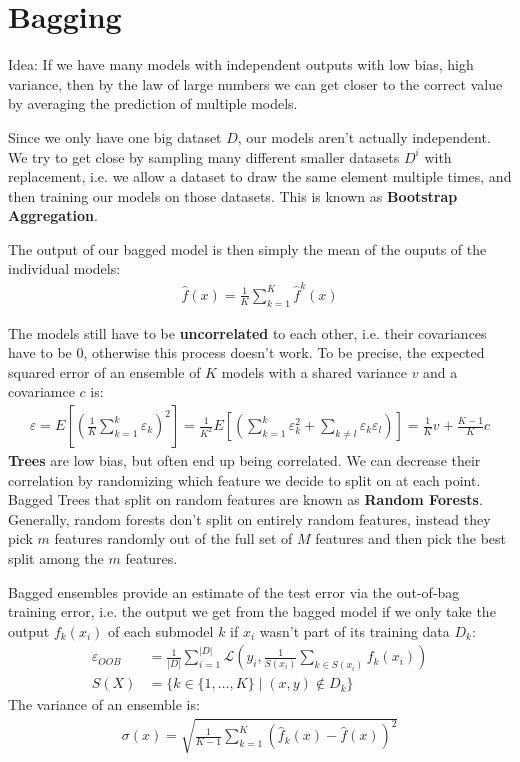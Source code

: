 \documentclass{report}
\renewcommand\epsilon{\varepsilon}
\newcommand{\tbf}{\textbf}
\newcommand*{\newpar}{\par\vspace{\baselineskip}\noindent}
\newcommand{\loss}{\mathcal{L}}
\begin{document}
\section{Bagging}
Idea: If we have many models with independent outputs with low bias, high variance, then by the law of large numbers we can get closer to the correct value by averaging the prediction of multiple models.
\newpar
Since we only have one big dataset $D$, our models aren't actually independent. We try to get close by sampling many different smaller datasets $D^i$ with replacement, i.e. we allow a dataset to draw the same element multiple times, and then training our models on those datasets. This is known as \tbf{Bootstrap Aggregation}.
\newpar
The output of our bagged model is then simply the mean of the ouputs of the individual models:
\begin{align}
 \hat{f}(x) = \frac{1}{K} \sum_{k=1}^K \hat{f}^k(x)
\end{align}
\newpar
The models still have to be \tbf{uncorrelated} to each other, i.e. their covariances have to be $0$, otherwise this process doesn't work. To be precise, the expected squared error of an ensemble of $K$ models with a shared variance $v$ and a covariamce $c$ is:
\begin{align}
 \epsilon = E\left[\left(\frac{1}{K}\sum_{k=1}^k \epsilon_k\right)^2\right] = \frac{1}{K^2}E\left[\left(\sum_{k=1}^k \epsilon_k^2 + \sum_{k \neq l} \epsilon_k \epsilon_l\right)\right] = \frac{1}{K}v + \frac{K-1}{K}c
\end{align}
\tbf{Trees} are low bias, but often end up being correlated. We can decrease their correlation by randomizing which feature we decide to split on at each point. Bagged Trees that split on random features are known as \tbf{Random Forests}. Generally, random forests don't split on entirely random features, instead they pick $m$ features randomly out of the full set of $M$ features and then pick the best split among the $m$ features.
\newpar
Bagged ensembles provide an estimate of the test error via the out-of-bag training error, i.e. the output we get from the bagged model if we only take the output $f_k(x_i)$ of each submodel $k$ if $x_i$ wasn't part of its training data $D_k$:
\begin{align}
 \epsilon_{OOB}& = \frac{1}{|D|} \sum_{i=1}^{|D|} \loss\left(y_i, \frac{1}{S(x_i)} \sum_{k \in S(x_i)}f_k(x_i)\right)\\
 S(X) &= \{k \in \{1, \hdots, K\} \mid (x,y) \notin D_{k}\}
\end{align}
The variance of an ensemble is:
\begin{align}
 \sigma(x) = \sqrt{\frac{1}{K-1}\sum_{k=1}^K \left(\hat{f}_k(x) -\hat{f}(x)\right)^2}
\end{align}
%
\end{document}
